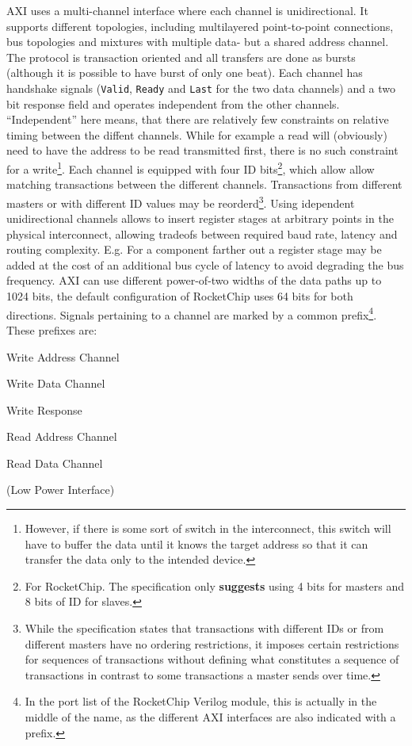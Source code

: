 \documentclass[journal,a4paper]{IEEEtran}
\begin{document}
AXI uses a multi-channel interface where each channel is unidirectional.
It supports different topologies, including multilayered point-to-point connections, bus topologies and mixtures with multiple data- but a shared address channel.
The protocol is transaction oriented and all transfers are done as bursts (although it is possible to have burst of only one beat).
Each channel has handshake signals (\texttt{Valid}, \texttt{Ready} and \texttt{Last} for the two data channels) and a two bit response field and operates independent from the other channels.
``Independent'' here means, that there are relatively few constraints on relative timing between the diffent channels.
While for example a read will (obviously) need to have the address to be read transmitted first, there is no such constraint for a write\footnote{However, if there is some sort of switch in the interconnect, this switch will have to buffer the data until it knows the target address so that it can transfer the data only to the intended device.}.
Each channel is equipped with four ID bits\footnote{For RocketChip. The specification only \textbf{suggests} using 4 bits for masters and 8 bits of ID for slaves.}, which allow allow matching transactions between the different channels.
Transactions from different masters or with different ID values may be reorderd\footnote{While the specification states that transactions with different IDs or from different masters have no ordering restrictions, it imposes certain restrictions for sequences of transactions\cite[5.3]{axi} without defining what constitutes a sequence of transactions in contrast to some transactions a master sends over time.}.
Using idependent unidirectional channels allows to insert register stages at arbitrary points in the physical interconnect, allowing tradeofs between required baud rate, latency and routing complexity. E.g. For a component farther out a register stage may be added at the cost of an additional bus cycle of latency to avoid degrading the bus frequency.
AXI can use different power-of-two widths of the data paths up to 1024 bits, the default configuration of RocketChip uses 64 bits for both directions.
Signals pertaining to a channel are marked by a common prefix\footnote{In the port list of the RocketChip Verilog module, this is actually in the middle of the name, as the different AXI interfaces are also indicated with a prefix.}.
These prefixes are:
%
\begin{description}
	\item[\texttt{\ldots\_aw\_\ldots}]   Write Address Channel
	\item[\texttt{\ldots\_w\_\ldots}]    Write Data Channel
	\item[\texttt{\ldots\_b\_\ldots}]    Write Response
	\item[\texttt{\ldots\_ar\_\ldots}]   Read Address Channel
	\item[\texttt{\ldots\_r\_\ldots}]    Read Data Channel
	\item[\texttt{\ldots\_c\_\ldots}]    (Low Power Interface)
\end{description}
\end{document}
